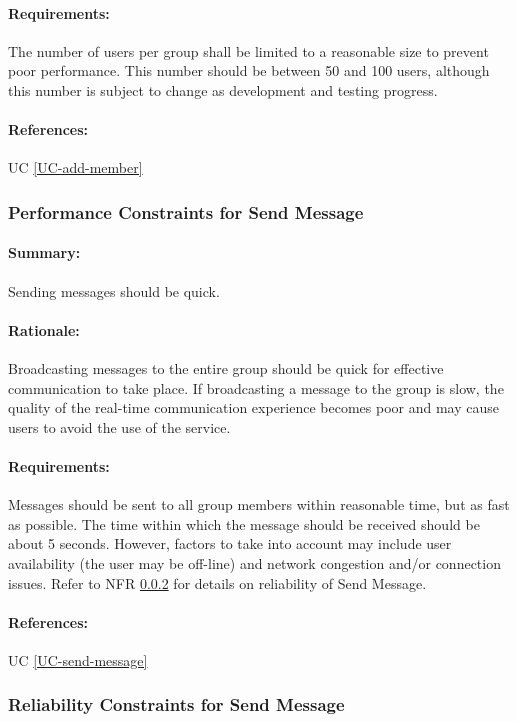 \documentclass[11pt]{article}
\begin{document}
\paragraph{Requirements:} The number of users per group shall be limited to a reasonable size to prevent poor performance. This number should be between 50 and 100 users, although this number is subject to change as development and testing progress.
\paragraph{References:} UC \ref{UC-add-member}

\subsubsection{Performance Constraints for Send Message} \label{NFR-performance-send-message}
\paragraph{Summary:} Sending messages should be quick.
\paragraph{Rationale:} Broadcasting messages to the entire group should be quick for effective communication to take place. If broadcasting a message to the group is slow, the quality of the real-time communication experience becomes poor and may cause users to avoid the use of the service. 
\paragraph{Requirements:} Messages should be sent to all group members within reasonable time, but as fast as possible. The time within which the message should be received should be about 5 seconds. However, factors to take into account may include user availability (the user may be off-line) and network congestion and/or connection issues. Refer to NFR \ref{NFR-reliability-send-message} for details on reliability of Send Message.
\paragraph{References:} UC \ref{UC-send-message}

\subsubsection{Reliability Constraints for Send Message} \label{NFR-reliability-send-message}
\end{document}
